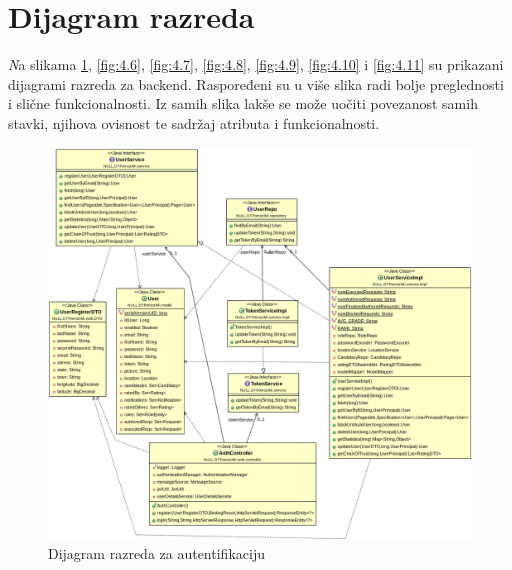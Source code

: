 			\eject
			
		\section{Dijagram razreda}
		
			\textit Na slikama  \ref{fig:4.5}, \ref{fig:4.6}, \ref{fig:4.7}, \ref{fig:4.8}, \ref{fig:4.9}, \ref{fig:4.10} i \ref{fig:4.11} su prikazani dijagrami razreda za backend. Raspoređeni su u više slika radi bolje preglednosti i slične funkcionalnosti. Iz samih slika lakše se može uočiti povezanost samih stavki, njihova ovisnost te sadržaj atributa i funkcionalnosti.
			\begin{figure}[H]
				\includegraphics[scale=0.45]{slike/authDIag.png} %
				\centering
				\caption { Dijagram razreda za autentifikaciju}
				\label{fig:4.5}
			\end{figure}
		
